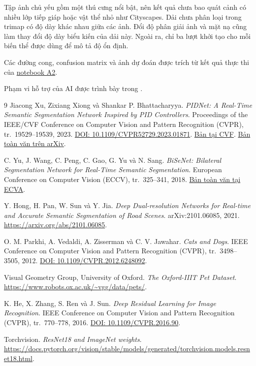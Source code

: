 \documentclass[12pt,a4paper]{report}
\begin{document}
Tập ảnh chủ yếu gồm một thú cưng nổi bật, nên kết quả chưa bao quát cảnh có nhiều lớp tiếp giáp hoặc vật thể nhỏ như Cityscapes. Dải chưa phân loại trong trimap có độ dày khác nhau giữa các ảnh. Đổi độ phân giải ảnh và mặt nạ cũng làm thay đổi độ dày biểu kiến của dải này. Ngoài ra, chỉ ba lượt khởi tạo cho mỗi biến thể được dùng để mô tả độ ổn định.

Các đường cong, confusion matrix và ảnh dự đoán được trích từ kết quả thực thi của \href{https://github.com/dathuynh1108/CO5085-deep-learning/blob/main/notebooks/A2.ipynb}{notebook A2}.

Phạm vi hỗ trợ của AI được trình bày trong \href{https://github.com/dathuynh1108/CO5085-deep-learning/blob/main/AI\_USE\_REPORT.md}{}.

\clearpage
\begin{thebibliography}{9}
 Jiacong Xu, Zixiang Xiong và Shankar P. Bhattacharyya.
\emph{PIDNet: A Real-Time Semantic Segmentation Network Inspired by PID Controllers}.
Proceedings of the IEEE/CVF Conference on Computer Vision and Pattern Recognition (CVPR), tr.~19529--19539, 2023.
\href{https://doi.org/10.1109/CVPR52729.2023.01871}{DOI: 10.1109/CVPR52729.2023.01871}.
\href{https://openaccess.thecvf.com/content/CVPR2023/html/Xu_PIDNet_A_Real-Time_Semantic_Segmentation_Network_Inspired_by_PID_Controllers_CVPR_2023_paper.html}{Bản tại CVF}.
\href{https://arxiv.org/abs/2206.02066}{Bản toàn văn trên arXiv}.

 C. Yu, J. Wang, C. Peng, C. Gao, G. Yu và N. Sang.
\emph{BiSeNet: Bilateral Segmentation Network for Real-Time Semantic Segmentation}.
European Conference on Computer Vision (ECCV), tr.~325--341, 2018.
\href{https://www.ecva.net/papers/eccv_2018/papers_ECCV/html/Changqian_Yu_BiSeNet_Bilateral_Segmentation_ECCV_2018_paper.php}{Bản toàn văn tại ECVA}.

 Y. Hong, H. Pan, W. Sun và Y. Jia.
\emph{Deep Dual-resolution Networks for Real-time and Accurate Semantic Segmentation of Road Scenes}.
arXiv:2101.06085, 2021.
\url{https://arxiv.org/abs/2101.06085}.

 O. M. Parkhi, A. Vedaldi, A. Zisserman và C. V. Jawahar.
\emph{Cats and Dogs}. IEEE Conference on Computer Vision and Pattern Recognition (CVPR), tr.~3498--3505, 2012.
\href{https://doi.org/10.1109/CVPR.2012.6248092}{DOI: 10.1109/CVPR.2012.6248092}.

 Visual Geometry Group, University of Oxford.
\emph{The Oxford-IIIT Pet Dataset}. \url{https://www.robots.ox.ac.uk/~vgg/data/pets/}.

 K. He, X. Zhang, S. Ren và J. Sun.
\emph{Deep Residual Learning for Image Recognition}.
IEEE Conference on Computer Vision and Pattern Recognition (CVPR), tr.~770--778, 2016.
\href{https://doi.org/10.1109/CVPR.2016.90}{DOI: 10.1109/CVPR.2016.90}.

 Torchvision. \emph{ResNet18 and ImageNet weights}.
\url{https://docs.pytorch.org/vision/stable/models/generated/torchvision.models.resnet18.html}.
\end{thebibliography}
\end{document}
